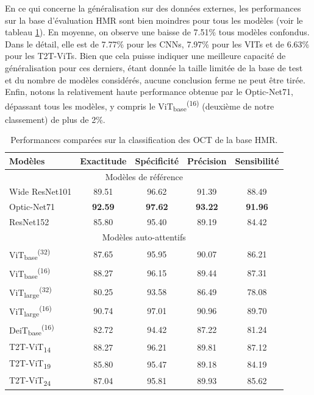 En ce qui concerne la généralisation sur des données externes, les performances sur la base d'évaluation \ac{HMR} sont bien moindres pour tous les modèles (voir le tableau \ref{tab:performance-HMR data}). En moyenne, on observe une baisse de 7.51\% tous modèles confondus. Dans le détail, elle est de 7.77\% pour les CNNs, 7.97\% pour les VITs et de 6.63\% pour les T2T-ViTs. Bien que cela puisse indiquer une meilleure capacité de généralisation pour ces derniers, étant donnée la taille limitée de la base de test et du nombre de modèles considérés, aucune conclusion ferme ne peut être tirée. Enfin, notons la relativement haute performance obtenue par le Optic-Net71, dépassant tous les modèles, y compris le ViT\textsubscript{base}\textsuperscript{(16)} (deuxième de notre classement) de plus de 2\%.

\begin{table}[!h]
	\caption{Performances comparées sur la classification des OCT de la base \ac{HMR}.}
	\label{tab:performance-HMR data}
	\centering
	
	\begin{tabularx}{\columnwidth}{Xcccc}
		\hline
		Modèles &  Exactitude & Spécificité &  Précision & Sensibilité\\
		\hline
		\multicolumn{5}{c}{Modèles de référence} \\
		\hline
		Wide ResNet101  &   89.51 & 96.62 & 91.39 & 88.49 \\
		Optic-Net71  &   \textbf{92.59} & \textbf{97.62} & \textbf{93.22} & \textbf{91.96}\\
		ResNet152 &   85.80 & 95.40 & 89.19 & 84.42 \\
		\hline
		\multicolumn{5}{c}{Modèles auto-attentifs} \\
		\hline
		ViT\textsubscript{base}\textsuperscript{(32)}  & 87.65 & 95.95 & 90.07 & 86.21\\
		ViT\textsubscript{base}\textsuperscript{(16)} &  88.27 & 96.15 & 89.44 & 87.31\\
		ViT\textsubscript{large}\textsuperscript{(32)} & 80.25 & 93.58 & 86.49 & 78.08 \\
		ViT\textsubscript{large}\textsuperscript{(16)} & 90.74 & 97.01 & 90.96 & 89.70 \\
		DeiT\textsubscript{base}\textsuperscript{(16)} & 82.72 & 94.42 & 87.22 & 81.24 \\
		T2T-ViT\textsubscript{14} &88.27 & 96.21 & 89.81 & 87.12 \\
		T2T-ViT\textsubscript{19} &85.80 & 95.47 & 89.18 & 84.19 \\
		T2T-ViT\textsubscript{24} &87.04 & 95.81 & 89.93 & 85.62 \\
		\hline
	\end{tabularx}
\end{table}

